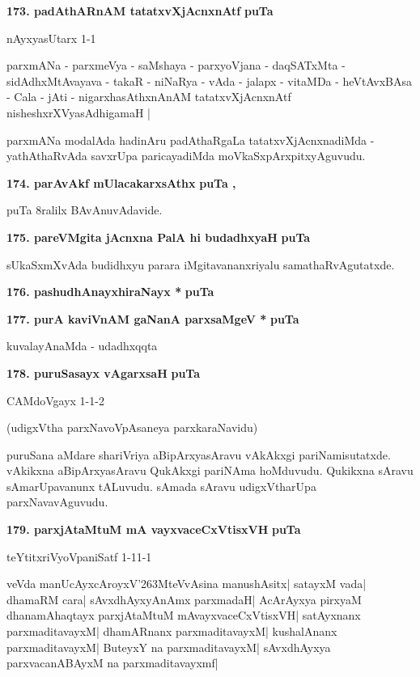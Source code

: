 \medskip
\noindent
\textbf{173. padAthARnAM tatatxvXjAcnxnAtf} \hfill{\bf puTa \pageref{41}}

\hfill{nAyxyasUtarx 1-1}

\smallskip
parxmANa - parxmeVya - saMshaya - parxyoVjana - daqSATxMta - sidAdhxMtAvayava - takaR - niNaRya\- - vAda - jalapx - vitaMDa - heVtAvxBAsa - Cala - jAti - nigarxhasAthxnAnAM tatatxvXjAcnxnAtf nisheshxrXVyasAdhigamaH |

parxmANa modalAda hadinAru padAthaRgaLa tatatxvXjAcnxnadiMda - yathAthaR\-vAda savxrUpa paricaya\-diMda moVkaSxpArxpitxyAguvudu.

\medskip
\noindent
\textbf{174. parAvAkf mUlacakarxsAthx} \hfill{\bf puTa \pageref{8}, \pageref{171}}

\smallskip
puTa 8ralilx BAvAnuvAdavide.

\medskip
\noindent
\textbf{175. pareVMgita jAcnxna PalA hi budadhxyaH} \hfill{\bf puTa \pageref{72}}

\smallskip
sUkaSxmXvAda budidhxyu parara iMgitavananxriyalu samathaRvAgutatxde.

\eject

\noindent
\textbf{176. pashudhAnayxhiraNayx *} \hfill{\bf puTa \pageref{95}}

\medskip
\noindent
\textbf{177. purA kaviVnAM gaNanA parxsaMgeV *} \hfill{\bf puTa \pageref{233}}

\hfill{kuvalayAnaMda - udadhxqqta}

\medskip
\noindent
\textbf{178. puruSasayx vAgarxsaH} \hfill{\bf puTa \pageref{152}}

\hfill{CAMdoVgayx 1-1-2}

\smallskip
(udigxVtha parxNavoVpAsaneya parxkaraNavidu)

puruSana aMdare shariVriya aBipArxyasAravu vAkAkxgi pariNamisutatxde. vAkikxna aBipArxya\-sAravu QukAkxgi pariNAma hoMduvudu. Qukikxna sAravu sAmarUpavanunx tALuvudu. sAmada sAravu udigxVtharUpa parxNavavAguvudu.

\medskip
\noindent
\textbf{179. parxjAtaMtuM mA vayxvaceCxVtisxVH} \hfill{\bf puTa \pageref{139}}

\hfill{teYtitxriVyoVpaniSatf 1-11-1}

\smallskip
veVda manUcAyxcAroyxV\char'263MteVvAsina manushAsitx| satayxM vada| dhamaRM cara| sAvxdhAyxyAnAmx parxmadaH| AcArAyxya pirxyaM dhanamAhaqtayx parxjAtaMtuM mAvayxvaceCxVtisxVH| satAyxnanx\- parxmaditavayxM| dhamARnanx\- parxma\-ditavayxM| kushalAnanx parxmaditavayxM| ButeyxY na parxmaditavayxM| sAvxdhAyxya parxvacanABAyxM na parxmadita\-vayxmf|

